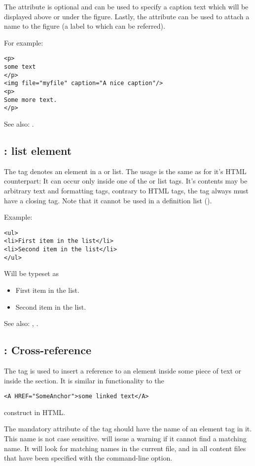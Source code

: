 The  attribute is optional and can be used to specify a
caption text which will be displayed above or under the figure. 
Lastly, the  attribute can be used to attach
a name to the figure (a label to which can be referred).

For example:
\begin{verbatim}
<p>
some text
</p>
<img file="myfile" caption="A nice caption"/>
<p>
Some more text.
</p>
\end{verbatim}

See also: .

\subsection{ : list element}
\label{tag:li}
The tag  denotes an element in a  or  list.
The usage is the same as for it's HTML counterpart: It can occur 
only inside one of the   or  list tags.
It's contents may be arbitrary text and formatting tags, contrary to HTML
tags, the  tag always must have a closing tag. Note that it cannot be used in a
definition list ().

Example:
\begin{verbatim}
<ul>
<li>First item in the list</li>
<li>Second item in the list</li>
</ul>
\end{verbatim}
Will be typeset as
\begin{itemize}
\item First item in the list.
\item Second item in the list.
\end{itemize}

See also: , .

\subsection{ : Cross-reference}
\label{tag:link}
The  tag is used to insert a reference to an element inside some
piece of text or inside the  section. It is similar in
functionality to the 
\begin{verbatim}
<A HREF="SomeAnchor">some linked text</A>
\end{verbatim}
construct in HTML.

The mandatory  attribute of the  tag should have the 
name of an element tag in it. This name is not case sensitive. \fpdoc
will issue a warning if it cannot find a matching name. It will look for
matching names in the current file, and in all content files that have been
specified with the  command-line option.

